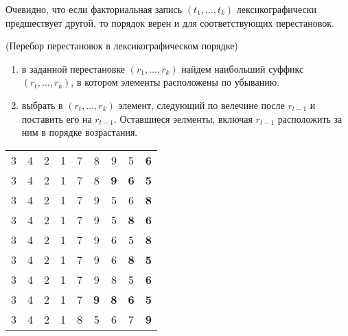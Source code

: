\begin{remark}
    Очевидно, что если факториальная запись $(t_1, \ldots, t_k)$ лексикографически предшествует другой, то порядок верен и для соответствующих перестановок.
\end{remark}

\begin{algoritm} (Перебор перестановок в лексикографическом порядке)

    \begin{enumerate}
        \item в заданной перестановке $(r_1, \ldots, r_k)$ найдем наибольший суффикс $(r_t, \ldots, r_k)$, в котором элементы расположены по убыванию.
        \item выбрать в $(r_t, \ldots, r_k)$ элемент, следующий по велечине после $r_{t-1}$ и поставить его на $r_{t-1}$. Оставшиеся эелменты, включая $r_{t-1}$ расположить за ним в порядке возрастания.
    \end{enumerate}
\end{algoritm}

\begin{eg}
    \begin{tabular}{ccccccccc}
        3 & 4 & 2 & 1 & 7 & 8 & 9 & 5 & \textbf{6} \\
        3 & 4 & 2 & 1 & 7 & 8 & \textbf{9} & \textbf{6} & \textbf{5} \\
        3 & 4 & 2 & 1 & 7 & 9 & 5 & 6 & \textbf{8} \\
        3 & 4 & 2 & 1 & 7 & 9 & 5 & \textbf{8} & \textbf{6} \\
        3 & 4 & 2 & 1 & 7 & 9 & 6 & 5 & \textbf{8} \\
        3 & 4 & 2 & 1 & 7 & 9 & 6 & \textbf{8} & \textbf{5} \\
        3 & 4 & 2 & 1 & 7 & 9 & 8 & 5 & \textbf{6} \\
        3 & 4 & 2 & 1 & 7 & \textbf{9} & \textbf{8} & \textbf{6} & \textbf{5} \\
        3 & 4 & 2 & 1 & 8 & 5 & 6 & 7 & \textbf{9} \\
    \end{tabular}
\end{eg}             